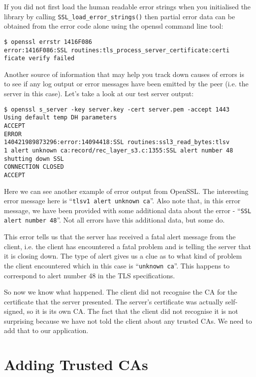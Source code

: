 If you did not first load the human readable error strings when you initialised 
the library by calling \verb!SSL_load_error_strings()! then partial error data
can be obtained from the error code alone using the openssl command line tool:

\begin{verbatim}
$ openssl errstr 1416F086
error:1416F086:SSL routines:tls_process_server_certificate:certi
ficate verify failed
\end{verbatim}

Another source of information that may help you track down causes of errors is 
to see if any log output or error messages have been emitted by the peer (i.e. 
the server in this case). Let's take a look at our test server output:

\begin{verbatim}
$ openssl s_server -key server.key -cert server.pem -accept 1443
Using default temp DH parameters
ACCEPT
ERROR
140421989873296:error:14094418:SSL routines:ssl3_read_bytes:tlsv
1 alert unknown ca:record/rec_layer_s3.c:1355:SSL alert number 48
shutting down SSL
CONNECTION CLOSED
ACCEPT
\end{verbatim}

Here we can see another example of error output from OpenSSL. The interesting 
error message here is ``\verb!tlsv1 alert unknown ca!''. Also note that, in 
this error message, we have been provided with some additional data about the 
error - ``\verb!SSL alert number 48!''. Not all errors have this additional 
data, but some do.

This error tells us that the server has received a fatal alert message from the 
client, i.e. the client has encountered a fatal problem and is telling the 
server that it is closing down. The type of alert gives us a clue as to what 
kind of problem the client encountered which in this case is
``\verb!unknown ca!''. This happens to correspond to alert number 48 in the TLS 
specifications.

So now we know what happened. The client did not recognise the CA for the 
certificate that the server presented. The server's certificate was actually 
self-signed, so it is its own CA. The fact that the client did not recognise it 
is not surprising because we have not told the client about any trusted CAs. We 
need to add that to our application.

\section{Adding Trusted CAs}

